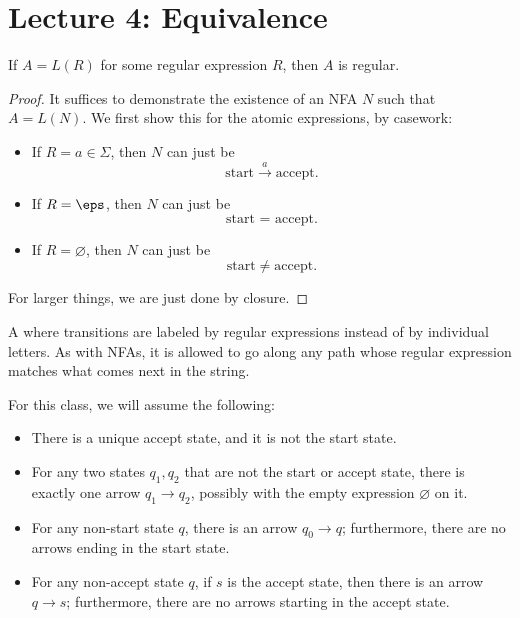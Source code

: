 \section*{Lecture 4: Equivalence}
\setcounter{section}{4}
\setcounter{subsection}{0}
\setcounter{defn}{0}
\setcounter{defncontainer}{0}

\begin{thm}
	If $A = L(R)$ for some regular expression $R$, then $A$ is regular.
\end{thm}

\begin{proof}
	It suffices to demonstrate the existence of an NFA $N$ such that $A = L(N)$. We first show this for the atomic expressions, by casework:
	\begin{itemize}
		\item If $R = a\in \Sigma$, then $N$ can just be \[
				\text{start} \stackrel{a}{\longrightarrow} \text{accept}.
			\]
		\item If $R = \eps$, then $N$ can just be \[
				\text{start = accept}.
			\]
		\item If $R = \varnothing$, then $N$ can just be \[
				\text{start} \neq \text{accept}.
			\]
	\end{itemize}
	For larger things, we are just done by closure.
\end{proof}

\begin{defn}
	A  where transitions are labeled by regular expressions instead of by individual letters.
	As with NFAs, it is allowed to go along any path whose regular expression matches what comes next in the string.

	For this class, we will assume the following:
	\begin{itemize}
		\item There is a unique accept state, and it is not the start state.
		\item For any two states $q_1, q_2$ that are not the start or accept state, there is exactly one arrow $q_1\to q_2$, possibly with the empty expression $\varnothing$ on it.
		\item For any non-start state $q$, there is an arrow $q_0\to q$; furthermore, there are no arrows ending in the start state.
		\item For any non-accept state $q$, if $s$ is the accept state, then there is an arrow $q\to s$; furthermore, there are no arrows starting in the accept state.
	\end{itemize}
\end{defn}

